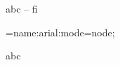 \documentclass{article}
\begin{document}
abc -- fi


\font\test={name:arial:mode=node;}

\test abc 
\end{document}
